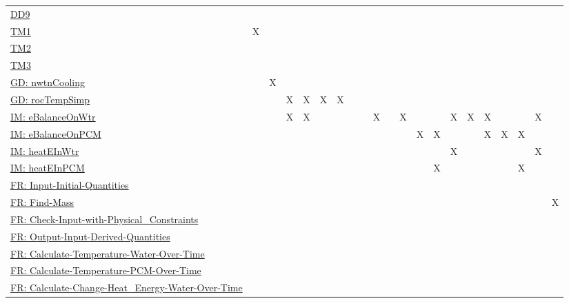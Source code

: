 \documentclass[12pt]{article}
\begin{document}
\begin{longtable}{l l l l l l l l l l l l l l l l l l l l l}
\hyperref[DD:aspectRatio]{DD9} &  &  &  &  &  &  &  &  &  &  &  &  &  &  &  &  &  &  &  & 
\\
\hyperref[TM:consThermE]{TM1} & X &  &  &  &  &  &  &  &  &  &  &  &  &  &  &  &  &  &  & 
\\
\hyperref[TM:sensHtE]{TM2} &  &  &  &  &  &  &  &  &  &  &  &  &  &  &  &  &  &  &  & 
\\
\hyperref[TM:latentHtE]{TM3} &  &  &  &  &  &  &  &  &  &  &  &  &  &  &  &  &  &  &  & 
\\
\hyperref[GD:nwtnCooling]{GD: nwtnCooling} &  & X &  &  &  &  &  &  &  &  &  &  &  &  &  &  &  &  &  & 
\\
\hyperref[GD:rocTempSimp]{GD: rocTempSimp} &  &  & X & X & X & X &  &  &  &  &  &  &  &  &  &  &  &  &  & 
\\
\hyperref[IM:eBalanceOnWtr]{IM: eBalanceOnWtr} &  &  & X & X &  &  &  &  & X &  & X &  &  & X & X & X &  &  & X & 
\\
\hyperref[IM:eBalanceOnPCM]{IM: eBalanceOnPCM} &  &  &  &  &  &  &  &  &  &  &  & X & X &  &  & X & X & X &  & 
\\
\hyperref[IM:heatEInWtr]{IM: heatEInWtr} &  &  &  &  &  &  &  &  &  &  &  &  &  & X &  &  &  &  & X & 
\\
\hyperref[IM:heatEInPCM]{IM: heatEInPCM} &  &  &  &  &  &  &  &  &  &  &  &  & X &  &  &  &  & X &  & 
\\
\hyperref[inputInitQuants]{FR: Input-Initial-Quantities} &  &  &  &  &  &  &  &  &  &  &  &  &  &  &  &  &  &  &  & 
\\
\hyperref[findMass]{FR: Find-Mass} &  &  &  &  &  &  &  &  &  &  &  &  &  &  &  &  &  &  &  & X
\\
\hyperref[checkWithPhysConsts]{FR: Check-Input-with-Physical\_Constraints} &  &  &  &  &  &  &  &  &  &  &  &  &  &  &  &  &  &  &  & 
\\
\hyperref[outputInputDerivQuants]{FR: Output-Input-Derived-Quantities} &  &  &  &  &  &  &  &  &  &  &  &  &  &  &  &  &  &  &  & 
\\
\hyperref[calcTempWtrOverTime]{FR: Calculate-Temperature-Water-Over-Time} &  &  &  &  &  &  &  &  &  &  &  &  &  &  &  &  &  &  &  & 
\\
\hyperref[calcTempPCMOverTime]{FR: Calculate-Temperature-PCM-Over-Time} &  &  &  &  &  &  &  &  &  &  &  &  &  &  &  &  &  &  &  & 
\\
\hyperref[calcChgHeatEnergyWtrOverTime]{FR: Calculate-Change-Heat\_Energy-Water-Over-Time} &  &  &  &  &  &  &  &  &  &  &  &  &  &  &  &  &  &  &  & 
\\

\end{longtable}
\end{document}

